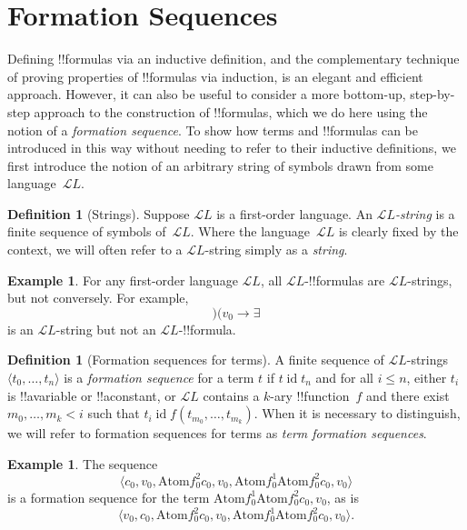 \documentclass[10pt,a4paper]{article}
\theoremstyle{plain}
\theoremstyle{definition}
\newtheorem{defn}[thm]{Definition}
\newtheorem{ex}[thm]{Example}
\theoremstyle{remark}
\newcommand*{\olfileid}[3]{}
\newcommand*{\olsection}[1]{\section*{#1}}
\newcommand*{\ollabel}[1]{\label{#1}}
\providecommand{\lif}{\mathbin{\rightarrow}}
\providecommand{\lexists}{\mathord{\exists}}
\providecommand{\Obj}{}
\providecommand{\Lang}{\ensuremath{\mathcal{L}}}
\providecommand{\tuple}[1]{\langle #1 \rangle}
\providecommand{\Atom}{\mathrm{Atom}}
\providecommand{\ident}{\operatorname{id}}
\begin{document}
\olfileid{fol}{syn}{fseq}

\olsection{Formation Sequences}

Defining !!{formula}s via an inductive definition, and the
complementary technique of proving properties of !!{formula}s via
induction, is an elegant and efficient approach. However, it can
also be useful to consider a more bottom-up, step-by-step approach
to the construction of !!{formula}s, which we do here using the
notion of a \emph{formation sequence}.
%
To show how terms and !!{formula}s can be introduced in this way
without needing to refer to their inductive definitions, we first
introduce the notion of an arbitrary string of symbols drawn from
some language~$\Lang L$.

\begin{defn}[Strings]
\ollabel{defn:string}
Suppose $\Lang L$ is a first-order language. An \emph{$\Lang
L$-string} is a finite sequence of symbols of~$\Lang L$. Where the
language~$\Lang L$ is clearly fixed by the context, we will often
refer to a $\Lang L$-string simply as a \emph{string}.
\end{defn}

\begin{ex}
For any first-order language $\Lang L$, all
$\Lang L$-!!{formula}s are $\Lang L$-strings, but not
conversely. For example, \[)(\Obj v_0\lif\lexists\] is an
$\Lang L$-string but not an $\Lang L$-!!{formula}.
\end{ex}

\begin{defn}[Formation sequences for terms]
\ollabel{defn:fseq-trm}
A finite sequence of $\Lang L$-strings $\tuple{t_0,\dotsc,t_n}$ is a
\emph{formation sequence} for a term $t$ if $t \ident t_n$ and for all
$i \leq n$, either $t_i$ is !!a{variable} or !!a{constant}, or $\Lang
L$ contains a $k$-ary !!{function}~$f$ and there exist
$m_0,\dotsc,m_k < i$ such that $t_i \ident f(t_{m_0},\dotsc,t_{m_k})$.
When it is necessary to distinguish, we will refer to formation
sequences for terms as \emph{term formation sequences}.
\end{defn}

\begin{ex}
The sequence
\[
    \tuple{\Obj c_0, \Obj v_0, \Atom{\Obj f^2_0}{\Obj c_0, \Obj v_0}, \Atom{\Obj f^1_0}{\Atom{\Obj f^2_0}{\Obj c_0, \Obj v_0}}}
\]
is a formation sequence for the term $\Atom{\Obj f^1_0}{\Atom{\Obj
f^2_0}{\Obj c_0, \Obj v_0}}$, as is
\[
    \tuple{\Obj v_0, \Obj c_0, \Atom{\Obj f^2_0}{\Obj c_0, \Obj v_0}, \Atom{\Obj f^1_0}{\Atom{\Obj f^2_0}{\Obj c_0, \Obj v_0}}}.
\]
\end{ex}
\end{document}
